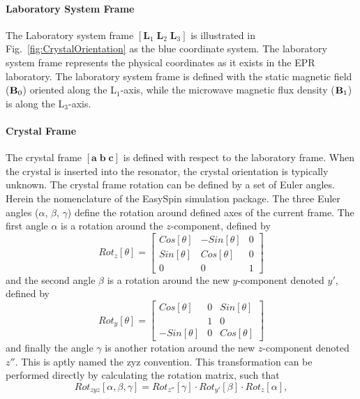 \paragraph*{Laboratory System Frame} The Laboratory system frame $[\mathbf{L}_1\; \mathbf{L}_2\; \mathbf{L}_3]$ is illustrated in Fig.~\ref{fig:CrystalOrientation} as the blue coordinate system. The laboratory system frame represents the physical coordinates as it exists in the EPR laboratory. The laboratory system frame is defined with the static magnetic field (${\textbf B}_0$) oriented along the L$_1$-axis, while the microwave magnetic flux density (${\textbf B}_1$) is along the L$_3$-axis. 

\paragraph*{Crystal Frame} The crystal frame $[\mathbf{a}\; \mathbf{b}\; \mathbf{c}]$ is defined with respect to the laboratory frame. When the crystal is inserted into the resonator, the crystal orientation is typically unknown. The crystal frame rotation can be defined by a set of Euler angles. Herein the nomenclature of the EasySpin simulation package. \cite{STOLL200642} The three Euler angles ($\alpha$, $\beta$, $\gamma$) define the rotation around defined axes of the current frame. The first angle $\alpha$ is a rotation around the $z$-component, defined by
\begin{equation}
    Rot_z[\theta] = \begin{bmatrix}
   Cos[\theta] & -Sin[\theta] & 0\\
    Sin[\theta] & Cos[\theta] & 0\\
    0 &  0 & 1
   \end{bmatrix}
\end{equation}
and the second angle $\beta$ is a rotation around the new $y$-component denoted $y'$, defined by
\begin{equation}
    Rot_y[\theta] = \begin{bmatrix}
   Cos[\theta] & 0 & Sin[\theta]\\
     & 1 & 0\\
    -Sin[\theta] &  0 & Cos[\theta]
   \end{bmatrix}
\end{equation}
and finally the angle $\gamma$ is another rotation around the new $z$-component denoted $z''$. This is aptly named the zyz convention. This transformation can be performed directly by calculating the rotation matrix, such that
\begin{equation}
    Rot_{zyz}[\alpha, \beta, \gamma] = Rot_{z''}[\gamma] \cdot Rot_{y'}[\beta] \cdot Rot_z[\alpha],
\end{equation}
